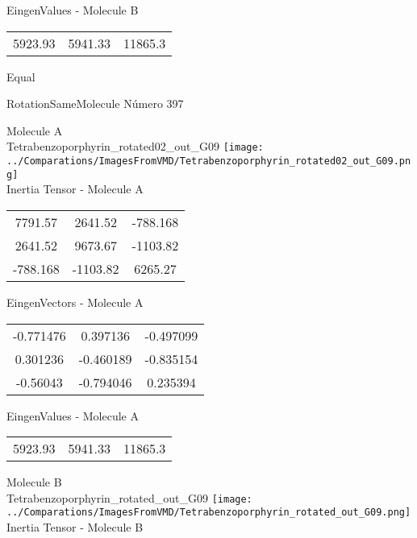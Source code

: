 \begin{multicols}{2}
\begin{center}
\vtab
 EingenValues - Molecule B     \\
\vtab
\begin{tabular}{|c c c|}
5923.93	 & 	5941.33	 & 	11865.3	 \\
\end{tabular}

\end{center}
\end{multicols}
\begin{center}
\vtab
\vtab
\textcolor{NavyBlue}{\Large Equal}
\end{center}

 \newpage

\vtab[-2cm]
\begin{center}
{\large RotationSameMolecule \tab Número 397}
\end{center}
\begin{multicols}{2}
\begin{center}

Molecule A \\ 
Tetrabenzoporphyrin\_rotated02\_out\_G09
\texttt{[image: ../Comparations/ImagesFromVMD/Tetrabenzoporphyrin\_rotated02\_out\_G09.png]}
\\
Inertia Tensor - Molecule A \\
\vtab

\begin{tabular}{|c c c|}
7791.57	 & 	2641.52	 & 	-788.168	 \\
2641.52	 & 	9673.67	 & 	-1103.82	 \\
-788.168	 & 	-1103.82	 & 	6265.27
\end{tabular}

\vtab
 EingenVectors - Molecule A     \\
\vtab
\begin{tabular}{|c c c|}
-0.771476	 & 	0.397136	 & 	-0.497099	 \\
0.301236	 & 	-0.460189	 & 	-0.835154	 \\
-0.56043	 & 	-0.794046	 & 	0.235394
\end{tabular}

\vtab
 EingenValues - Molecule A     \\
\vtab
\begin{tabular}{|c c c|}
5923.93	 & 	5941.33	 & 	11865.3	 \\
\end{tabular}
\columnbreak

Molecule B \\ 
Tetrabenzoporphyrin\_rotated\_out\_G09
\texttt{[image: ../Comparations/ImagesFromVMD/Tetrabenzoporphyrin\_rotated\_out\_G09.png]}
\\
Inertia Tensor - Molecule B \\
\vtab


\end{center}
\end{multicols}
